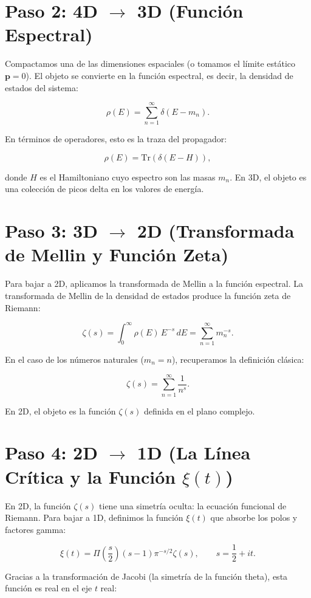 \documentclass[12pt,a4paper]{article}
\begin{document}
\section{Paso 2: 4D $\to$ 3D (Función Espectral)}

Compactamos una de las dimensiones espaciales (o tomamos el límite estático \(\mathbf{p}=0\)). El objeto se convierte en la función espectral, es decir, la densidad de estados del sistema:

\[
\rho(E) = \sum_{n=1}^{\infty} \delta(E - m_n).
\]

En términos de operadores, esto es la traza del propagador:

\[
\rho(E) = \text{Tr} \left( \delta(E - H) \right),
\]

donde \(H\) es el Hamiltoniano cuyo espectro son las masas \(m_n\). En 3D, el objeto es una colección de picos delta en los valores de energía.

\section{Paso 3: 3D $\to$ 2D (Transformada de Mellin y Función Zeta)}

Para bajar a 2D, aplicamos la transformada de Mellin a la función espectral. La transformada de Mellin de la densidad de estados produce la función zeta de Riemann:

\[
\zeta(s) = \int_{0}^{\infty} \rho(E) \, E^{-s} \, dE = \sum_{n=1}^{\infty} m_n^{-s}.
\]

En el caso de los números naturales (\(m_n = n\)), recuperamos la definición clásica:

\[
\zeta(s) = \sum_{n=1}^{\infty} \frac{1}{n^s}.
\]

En 2D, el objeto es la función \(\zeta(s)\) definida en el plano complejo.

\section{Paso 4: 2D $\to$ 1D (La Línea Crítica y la Función $\xi(t)$)}

En 2D, la función \(\zeta(s)\) tiene una simetría oculta: la ecuación funcional de Riemann. Para bajar a 1D, definimos la función \(\xi(t)\) que absorbe los polos y factores gamma:

\[
\xi(t) = \Pi\left(\frac{s}{2}\right)(s-1)\pi^{-s/2}\zeta(s), \qquad s = \frac{1}{2} + it.
\]

Gracias a la transformación de Jacobi (la simetría de la función theta), esta función es real en el eje \(t\) real:
\end{document}
